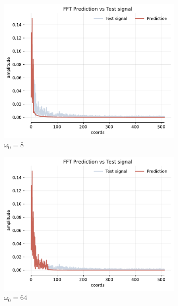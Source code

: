 \begin{figure}[h]
    \begin{subfigure}[b]{0.32\textwidth}
        \centering
        \includegraphics[width=\textwidth]{img/ch4/fft-noise-h0-w8.pdf}
        \caption{$\omega_0=8$}
        \label{fig:fft-noise-shallow-w8}
    \end{subfigure}
    \hfill
    \begin{subfigure}[b]{0.32\textwidth}
        \centering
        \includegraphics[width=\textwidth]{img/ch4/fft-noise-h0-w64.pdf}
        \caption{$\omega_0=64$}
        \label{fig:fft-noise-shallow-w64}
    \end{subfigure}
    \hfill
    \begin{subfigure}[b]{0.32\textwidth}

\end{subfigure}
\end{figure}
